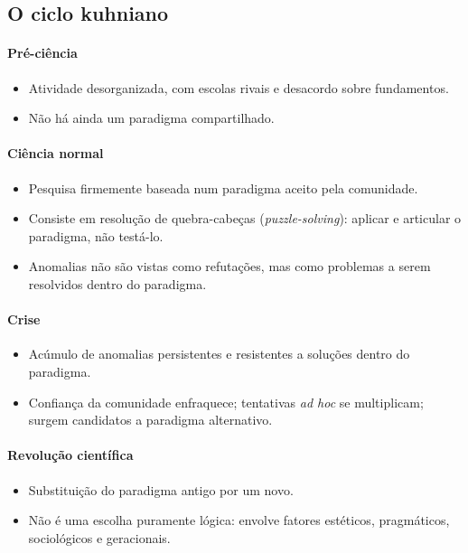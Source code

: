 \documentclass[9pt,a4paper]{extarticle}
\newcommand{\impt}[1]{\textcolor{important}{#1}}
\begin{document}
\subsection{O ciclo kuhniano}

\paragraph{Pré-ciência}
\begin{itemize}
    \item Atividade desorganizada, com escolas rivais e desacordo sobre fundamentos.
    \item Não há ainda um paradigma compartilhado.
\end{itemize}

\paragraph{Ciência normal}
\begin{itemize}
    \item Pesquisa firmemente baseada num paradigma aceito pela comunidade.
    \item Consiste em \impt{resolução de quebra-cabeças} (\textit{puzzle-solving}): aplicar e articular o paradigma, não testá-lo.
    \item Anomalias não são vistas como refutações, mas como problemas a serem resolvidos dentro do paradigma.
\end{itemize}

\paragraph{Crise}
\begin{itemize}
    \item Acúmulo de anomalias persistentes e resistentes a soluções dentro do paradigma.
    \item Confiança da comunidade enfraquece; tentativas \textit{ad hoc} se multiplicam; surgem candidatos a paradigma alternativo.
\end{itemize}

\paragraph{Revolução científica}
\begin{itemize}
    \item Substituição do paradigma antigo por um novo.
    \item Não é uma escolha puramente lógica: envolve fatores estéticos, pragmáticos, sociológicos e geracionais.
\end{itemize}
\end{document}
